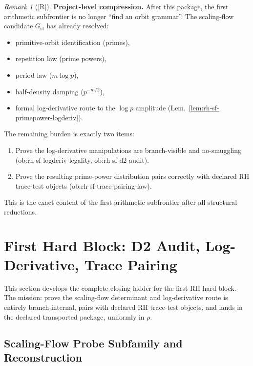 \documentclass[12pt,oneside]{amsbook}
\theoremstyle{plain}
\theoremstyle{definition}
\theoremstyle{remark}
\newtheorem{remark}[theorem]{Remark}
\newcommand{\status}[1]{\textup{[#1]}}
\begin{document}
\begin{remark}[\status{R}]\label{rem:rh-sf-remaining-burden}
\textbf{Project-level compression.}
After this package, the first arithmetic subfrontier is no longer
``find an orbit grammar''. The scaling-flow candidate $G_{\mathrm{sf}}$
has already resolved:
\begin{itemize}
 \item primitive-orbit identification (primes),
 \item repetition law (prime powers),
 \item period law ($m\log p$),
 \item half-density damping ($p^{-m/2}$),
 \item formal log-derivative route to the $\log p$ amplitude
 (Lem.~\ref{lem:rh-sf-primepower-logderiv}).
\end{itemize}
The remaining burden is exactly two items:
\begin{enumerate}[label=\textup{(\arabic*)}]
 \item Prove the log-derivative manipulations are branch-visible
 and no-smuggling (ob:rh-sf-logderiv-legality,
 ob:rh-sf-d2-audit).
 \item Prove the resulting prime-power distribution pairs correctly
 with declared RH trace-test objects (ob:rh-sf-trace-pairing-law).
\end{enumerate}
This is the exact content of the first arithmetic subfrontier
after all structural reductions.
\end{remark}


\section{First Hard Block: D2 Audit, Log-Derivative, Trace Pairing}
\label{sec:rh-first-hard-block}

This section develops the complete closing ladder for the first RH
hard block. The mission: prove the scaling-flow determinant and
log-derivative route is entirely branch-internal, pairs with declared
RH trace-test objects, and lands in the declared transported package,
uniformly in $\rho$.

\subsection{Scaling-Flow Probe Subfamily and Reconstruction}
\end{document}
